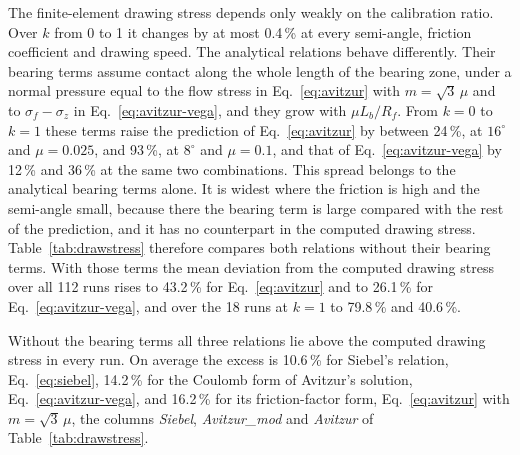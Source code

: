 The finite-element drawing stress depends only weakly on the calibration ratio. Over $k$ from 0 to
1 it changes by at most 0.4\,\% at every semi-angle, friction coefficient and drawing speed. The
analytical relations behave differently. Their bearing terms assume contact along the whole length
of the bearing zone, under a normal pressure equal to the flow stress in Eq.~\eqref{eq:avitzur}
with $m=\sqrt3\,\mu$ and to $\sigma_f-\sigma_z$ in Eq.~\eqref{eq:avitzur-vega}, and they grow with
$\mu L_b/R_f$. From $k=0$ to $k=1$ these terms raise the prediction of Eq.~\eqref{eq:avitzur} by
between 24\,\%, at $16^\circ$ and $\mu=0.025$, and 93\,\%, at $8^\circ$ and $\mu=0.1$, and that of
Eq.~\eqref{eq:avitzur-vega} by 12\,\% and 36\,\% at the same two combinations. This spread belongs
to the analytical bearing terms alone. It is widest where the friction is high and the semi-angle
small, because there the bearing term is large compared with the rest of the prediction, and it
has no counterpart in the computed drawing stress. Table~\ref{tab:drawstress} therefore compares
both relations without their bearing terms. With those terms the mean deviation from the computed
drawing stress over all 112 runs rises to 43.2\,\% for Eq.~\eqref{eq:avitzur} and to 26.1\,\% for
Eq.~\eqref{eq:avitzur-vega}, and over the 18 runs at $k=1$ to 79.8\,\% and 40.6\,\%.

Without the bearing terms all three relations lie above the computed drawing stress in every run.
On average the excess is 10.6\,\% for Siebel's relation, Eq.~\eqref{eq:siebel}, 14.2\,\% for the
Coulomb form of Avitzur's solution, Eq.~\eqref{eq:avitzur-vega}, and 16.2\,\% for its
friction-factor form, Eq.~\eqref{eq:avitzur} with $m=\sqrt3\,\mu$, the columns \emph{Siebel},
\emph{Avitzur\_mod} and \emph{Avitzur} of Table~\ref{tab:drawstress}.

